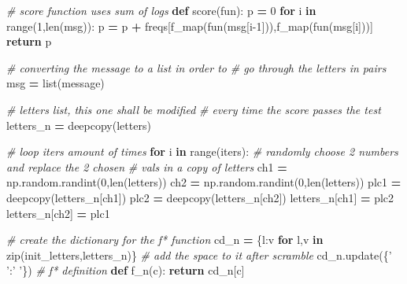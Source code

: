 \documentclass[]{article}
\newenvironment{Shaded}{\begin{snugshade}}{\end{snugshade}}
\newcommand{\BuiltInTok}[1]{#1}
\newcommand{\CommentTok}[1]{\textcolor[rgb]{0.56,0.35,0.01}{\textit{#1}}}
\newcommand{\ControlFlowTok}[1]{\textcolor[rgb]{0.13,0.29,0.53}{\textbf{#1}}}
\newcommand{\DecValTok}[1]{\textcolor[rgb]{0.00,0.00,0.81}{#1}}
\newcommand{\KeywordTok}[1]{\textcolor[rgb]{0.13,0.29,0.53}{\textbf{#1}}}
\newcommand{\NormalTok}[1]{#1}
\newcommand{\OperatorTok}[1]{\textcolor[rgb]{0.81,0.36,0.00}{\textbf{#1}}}
\newcommand{\StringTok}[1]{\textcolor[rgb]{0.31,0.60,0.02}{#1}}
\begin{document}
\begin{Shaded}
\begin{Highlighting}[]
    \CommentTok{# score function uses sum of logs}
    \KeywordTok{def}\NormalTok{ score(fun):}
\NormalTok{        p }\OperatorTok{=} \DecValTok{0}
        \ControlFlowTok{for}\NormalTok{ i }\KeywordTok{in} \BuiltInTok{range}\NormalTok{(}\DecValTok{1}\NormalTok{,}\BuiltInTok{len}\NormalTok{(msg)):}
\NormalTok{            p }\OperatorTok{=}\NormalTok{ p }\OperatorTok{+}\NormalTok{ freqs[f_map(fun(msg[i}\DecValTok{-1}\NormalTok{])),f_map(fun(msg[i]))]}
        \ControlFlowTok{return}\NormalTok{ p}
    
    \CommentTok{# converting the message to a list in order to}
    \CommentTok{# go through the letters in pairs}
\NormalTok{    msg }\OperatorTok{=} \BuiltInTok{list}\NormalTok{(message)}

    \CommentTok{# letters list, this one shall be modified}
    \CommentTok{# every time the score passes the test}
\NormalTok{    letters_n }\OperatorTok{=}\NormalTok{ deepcopy(letters)}

    \CommentTok{# loop iters amount of times}
    \ControlFlowTok{for}\NormalTok{ i }\KeywordTok{in} \BuiltInTok{range}\NormalTok{(iters):}
        \CommentTok{# randomly choose 2 numbers and replace the 2 chosen }
        \CommentTok{# vals in a copy of letters}
\NormalTok{        ch1 }\OperatorTok{=}\NormalTok{ np.random.randint(}\DecValTok{0}\NormalTok{,}\BuiltInTok{len}\NormalTok{(letters))}
\NormalTok{        ch2 }\OperatorTok{=}\NormalTok{ np.random.randint(}\DecValTok{0}\NormalTok{,}\BuiltInTok{len}\NormalTok{(letters))}
\NormalTok{        plc1 }\OperatorTok{=}\NormalTok{ deepcopy(letters_n[ch1])}
\NormalTok{        plc2 }\OperatorTok{=}\NormalTok{ deepcopy(letters_n[ch2])}
\NormalTok{        letters_n[ch1] }\OperatorTok{=}\NormalTok{ plc2}
\NormalTok{        letters_n[ch2] }\OperatorTok{=}\NormalTok{ plc1}

        \CommentTok{# create the dictionary for the f* function}
\NormalTok{        cd_n }\OperatorTok{=}\NormalTok{ \{l:v }\ControlFlowTok{for}\NormalTok{ l,v }\KeywordTok{in} \BuiltInTok{zip}\NormalTok{(init_letters,letters_n)\}}
        \CommentTok{# add the space to it after scramble}
\NormalTok{        cd_n.update(\{}\StringTok{' '}\NormalTok{:}\StringTok{' '}\NormalTok{\})}
        \CommentTok{# f* definition}
        \KeywordTok{def}\NormalTok{ f_n(c):}
            \ControlFlowTok{return}\NormalTok{ cd_n[c]}
    

\end{Highlighting}
\end{Shaded}
\end{document}
